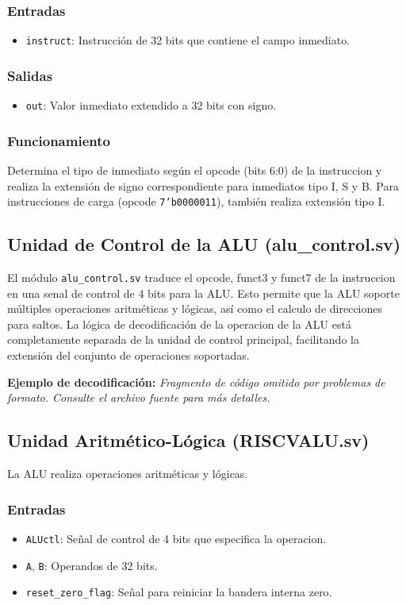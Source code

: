 \documentclass[conference]{IEEEtran}
\begin{document}
\subsubsection{Entradas}
\begin{itemize}
    \item \texttt{instruct}: Instrucción de 32 bits que contiene el campo inmediato.
\end{itemize}
\subsubsection{Salidas}
\begin{itemize}
    \item \texttt{out}: Valor inmediato extendido a 32 bits con signo.
\end{itemize}
\subsubsection{Funcionamiento}
Determina el tipo de inmediato según el opcode (bits 6:0) de la instruccion y realiza la extensión de signo correspondiente para inmediatos tipo I, S y B. Para instrucciones de carga (opcode \texttt{7'b0000011}), también realiza extensión tipo I.

\subsection{Unidad de Control de la ALU (alu\_control.sv)}
El módulo \texttt{alu\_control.sv} traduce el opcode, funct3 y funct7 de la instruccion en una senal de control de 4 bits para la ALU. Esto permite que la ALU soporte múltiples operaciones aritméticas y lógicas, así como el calculo de direcciones para saltos. La lógica de decodificación de la operacion de la ALU está completamente separada de la unidad de control principal, facilitando la extensión del conjunto de operaciones soportadas.

\textbf{Ejemplo de decodificación:}
\textit{Fragmento de código omitido por problemas de formato. Consulte el archivo fuente para más detalles.}

\subsection{Unidad Aritmético-Lógica (RISCVALU.sv)}
La ALU realiza operaciones aritméticas y lógicas.
\subsubsection{Entradas}
\begin{itemize}
    \item \texttt{ALUctl}: Señal de control de 4 bits que especifica la operacion.
    \item \texttt{A}, \texttt{B}: Operandos de 32 bits.
    \item \texttt{reset\_zero\_flag}: Señal para reiniciar la bandera interna zero.
\end{itemize}
\end{document}

